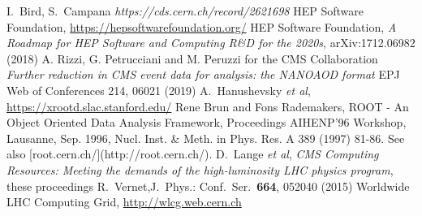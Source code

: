 \begin{thebibliography}{}
I.~Bird, S.~Campana \textit{https://cds.cern.ch/record/2621698}
HEP Software Foundation, \url{https://hepsoftwarefoundation.org/}
HEP Software Foundation, \textit{A Roadmap for HEP Software and Computing R\&D for the 2020s}, arXiv:1712.06982 (2018)
A. Rizzi, G. Petrucciani and M. Peruzzi for the CMS Collaboration \textit{Further reduction in CMS event data for analysis: the NANOAOD format} EPJ Web of Conferences 214, 06021 (2019)
A.~Hanushevsky {\em et al}, \url{https://xrootd.slac.stanford.edu/}
Rene Brun and Fons Rademakers, ROOT - An Object Oriented Data Analysis Framework,
Proceedings AIHENP'96 Workshop, Lausanne, Sep. 1996, Nucl. Inst. \& Meth. in Phys. Res. A 389 (1997) 81-86. See also [root.cern.ch/](http://root.cern.ch/).
D.~Lange {\em et al}, \textit{CMS Computing Resources: Meeting the demands of the high-luminosity LHC physics program}, these proceedings
R.~Vernet,J.\ Phys.: Conf.\ Ser.\ \textbf{664}, 052040 (2015)
Worldwide LHC Computing Grid, \url{http://wlcg.web.cern.ch}
\end{thebibliography}

